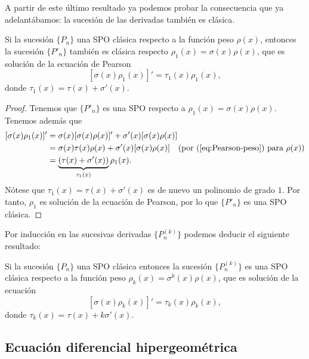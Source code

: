 A partir de este último resultado ya podemos probar la consecuencia que ya adelantábamos: la sucesión de las derivadas también es clásica.

\begin{corolario}
    \label{cor:derivadas-clasicas}
    Si la sucesión $\{P_n\}$ una SPO clásica respecto a la función peso $\rho(x)$, entonces la sucesión $\{P'_n\}$ también es clásica respecto $\rho_1(x)=\sigma(x)\rho(x)$, que es solución de la ecuación de Pearson
    \begin{equation}
        \label{eq:pearson-derivada}
        [\sigma(x)\rho_1(x)]' = \tau_1(x) \rho_1(x),
    \end{equation}
    donde $\tau_1(x)=\tau(x)+\sigma'(x)$.
\end{corolario}
\begin{proof}
    Tenemos que $\{P'_n\}$ es una SPO respecto a $\rho_1(x) = \sigma(x)\rho(x)$. Tenemos además que
    \begin{equation*}
        \begin{split}
            [\sigma(x)\rho_1(x)]' &= \sigma(x)[\sigma(x)\rho(x)]'+\sigma'(x)[\sigma(x)\rho(x)] \\
            &= \sigma(x)\tau(x)\rho(x) + \sigma'(x)[\sigma(x)\rho(x)] \  \ \ (\text{por (\ref{eq:Pearson-peso}) para }\rho(x)) \\
            &= \underbrace{(\tau(x)+\sigma'(x))}_{\tau_1(x)}\rho_1(x).
        \end{split}
    \end{equation*}
    Nótese que $\tau_1(x)=\tau(x)+\sigma'(x)$ es de nuevo un polinomio de grado $1$. Por tanto, $\rho_1$ es solución de la ecuación de Pearson, por lo que $\{P'_n\}$ es una SPO clásica.
\end{proof}

Por inducción en las sucesivas derivadas $\{P^{(k)}_n\}$ podemos deducir el siguiente resultado:

\begin{corolario}
    Si la sucesión $\{P_n\}$ una SPO clásica entonces la sucesión $\{P^{(k)}_n\}$ es una SPO clásica respecto a la función peso $\rho_k(x)=\sigma^k(x)\rho(x)$, que es solución de la ecuación
    \begin{equation}
        \label{eq:pearson-derivada-k}
        [\sigma(x)\rho_k(x)]' = \tau_k(x) \rho_k(x),
    \end{equation}
    donde $\tau_k(x)=\tau(x)+k\sigma'(x)$.
\end{corolario}

\subsection{Ecuación diferencial hipergeométrica}

